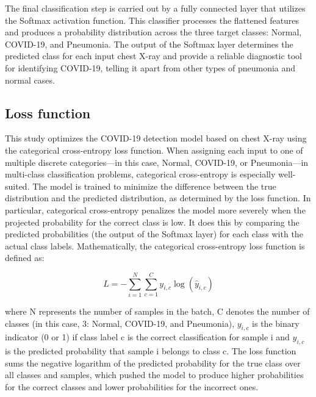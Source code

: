 \documentclass[12pt]{article}
\begin{document}
The final classification step is carried out by a fully connected layer that utilizes the Softmax activation function. This classifier processes the flattened features and produces a probability distribution across the three target classes: Normal, COVID-19, and Pneumonia. The output of the Softmax layer determines the predicted class for each input chest X-ray and provide a reliable diagnostic tool for identifying COVID-19, telling it apart from other types of pneumonia and normal cases.

\subsection{Loss function}
This study optimizes the COVID-19 detection model based on chest X-ray using the categorical cross-entropy loss function. When assigning each input to one of multiple discrete categories—in this case, Normal, COVID-19, or Pneumonia—in multi-class classification problems, categorical cross-entropy is especially well-suited. The model is trained to minimize the difference between the true distribution and the predicted distribution, as determined by the loss function. In particular, categorical cross-entropy penalizes the model more severely when the projected probability for the correct class is low. It does this by comparing the predicted probabilities (the output of the Softmax layer) for each class with the actual class labels.
Mathematically, the categorical cross-entropy loss function is defined as:

\begin{equation}
L= -\sum_{i=1}^N\sum_{c=1}^Cy_{i,c}\log(\hat{y}_{i,c})
\end{equation}

where N represents the number of samples in the batch, C denotes the number of classes (in this case, 3: Normal, COVID-19, and Pneumonia), \begin{math}y_{i,c}\end{math} is the binary indicator (0 or 1) if class label c is the correct classification for sample i and \begin{math}\hat{y}_{i,c}\end{math} is the predicted probability that sample i belongs to class c. The loss function sums the negative logarithm of the predicted probability for the true class over all classes and samples, which pushed the model to produce higher probabilities for the correct classes and lower probabilities for the incorrect ones.
\end{document}

